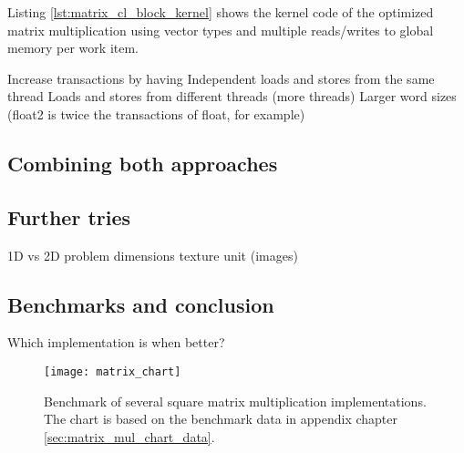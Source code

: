 Listing \ref{lst:matrix_cl_block_kernel} shows the kernel code of the optimized matrix multiplication using vector types and multiple reads/writes to global memory per work item.





Increase transactions by having
Independent loads and stores from the same thread
Loads and stores from different threads (more threads)
Larger word sizes (float2 is twice the transactions of float, for example)



\subsection{Combining both approaches}



\subsection{Further tries}
1D vs 2D problem dimensions
texture unit (images)


\subsection{Benchmarks and conclusion}
Which implementation is when better?


\begin{figure}
	\centering
	\texttt{[image: matrix\_chart]}
	\caption{Benchmark of several square matrix multiplication implementations. The chart is based on the benchmark data in appendix chapter \ref{sec:matrix_mul_chart_data}.}
	\label{fig:matrix_chart}
\end{figure}

